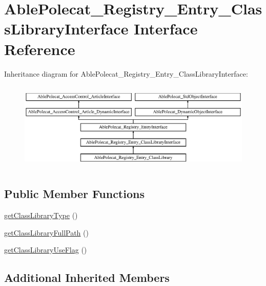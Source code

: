 \hypertarget{interface_able_polecat___registry___entry___class_library_interface}{}\section{Able\+Polecat\+\_\+\+Registry\+\_\+\+Entry\+\_\+\+Class\+Library\+Interface Interface Reference}
\label{interface_able_polecat___registry___entry___class_library_interface}
Inheritance diagram for Able\+Polecat\+\_\+\+Registry\+\_\+\+Entry\+\_\+\+Class\+Library\+Interface\+:\begin{figure}[H]
\begin{center}
\leavevmode
\includegraphics[height=4.268293cm]{interface_able_polecat___registry___entry___class_library_interface}
\end{center}
\end{figure}
\subsection*{Public Member Functions}
\begin{DoxyCompactItemize}
\item 
\hyperlink{interface_able_polecat___registry___entry___class_library_interface_a78da81e3fa32c22602195abcf4c21d3c}{get\+Class\+Library\+Type} ()
\item 
\hyperlink{interface_able_polecat___registry___entry___class_library_interface_a826677cf6939d076fd64c902ba6c0217}{get\+Class\+Library\+Full\+Path} ()
\item 
\hyperlink{interface_able_polecat___registry___entry___class_library_interface_af40e03caa4b08fe0b0a39031aa87bd81}{get\+Class\+Library\+Use\+Flag} ()
\end{DoxyCompactItemize}
\subsection*{Additional Inherited Members}


